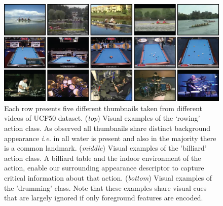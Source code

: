\documentclass[runningheads]{llncs}
\begin{document}
\begin{figure}[t!]
\begin{center}
\includegraphics[width=0.98\linewidth]{sift.png}
\end{center}
\vspace{-6pt}\caption{Each row presents five different thumbnails taken from different videos of UCF50 dataset. (\emph{top}) Visual examples of the `rowing' action class. As observed all thumbnails share distinct background appearance \emph{i.e.} in all water is present and also in the majority there is a common landmark. (\emph{middle}) Visual examples of the 'billiard' action class. A billiard table and the indoor environment of the action, enable our surrounding appearance descriptor to capture critical information about that action. (\emph{bottom}) Visual examples of the 'drumming' class. Note that these examples share visual cues that are largely ignored if only foreground features are encoded.}
\label{fig:sift_example}
\end{figure}
\end{document}
